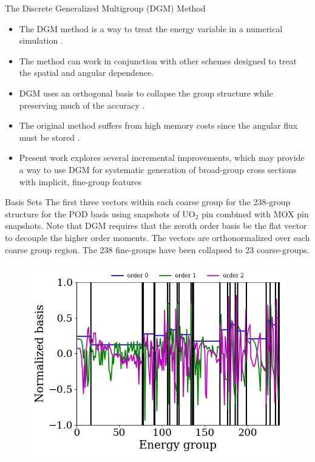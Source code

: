 \documentclass[final]{beamer}
\begin{document}
\begin{frame}{}
    \begin{columns}[t]
        \begin{column}{.32\linewidth}
            \begin{block}{The Discrete Generalized Multigroup (DGM) Method}
                \begin{itemize}
                    \item The DGM method is a way to treat the energy variable in a numerical simulation \cite{zhu_discrete_2010}.
                    \item The method can work in conjunction with other schemes designed to treat the spatial and angular dependence.
                    \item DGM uses an orthogonal basis to collapse the group structure while preserving much of the accuracy \cite{reed2019effectiveness}.
                    \item The original method suffers from high memory costs since the angular flux must be stored \cite{gibson_stability_2014}.
                    \item Present work explores several incremental improvements, which may provide a way to use DGM for systematic generation of broad-group cross sections with implicit, fine-group features
                \end{itemize}
            \end{block}
            \vfill
            \begin{block}{Basis Sets}
                The first three vectors within each coarse group for the 238-group structure for the POD basis using snapshots of UO$_2$ pin combined with MOX pin snapshots.
                Note that DGM requires that the zeroth order basis be the flat vector to decouple the higher order moments.
                The vectors are orthonormalized over each coarse group region.
                The 238 fine-groups have been collapsed to 23 coarse-groups.
                \begin{figure}[htb]
                    \includegraphics[scale=1.0, width=0.9\columnwidth]{klt_combine_contig_mean_238g}

\end{figure}
\end{block}
\end{column}
\end{columns}
\end{frame}
\end{document}
